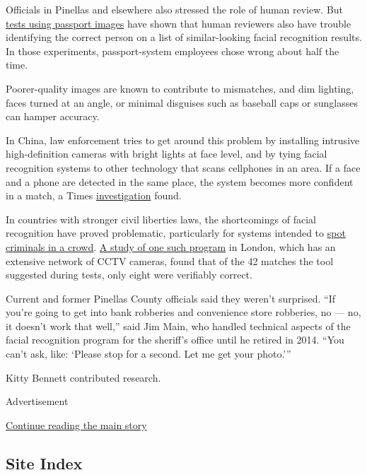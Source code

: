 Officials in Pinellas and elsewhere also stressed the role of human
review. But
\href{https://journals.plos.org/plosone/article?id=10.1371/journal.pone.0139827}{tests
using passport images} have shown that human reviewers also have trouble
identifying the correct person on a list of similar-looking facial
recognition results. In those experiments, passport-system employees
chose wrong about half the time.

Poorer-quality images are known to contribute to mismatches, and dim
lighting, faces turned at an angle, or minimal disguises such as
baseball caps or sunglasses can hamper accuracy.

In China, law enforcement tries to get around this problem by installing
intrusive high-definition cameras with bright lights at face level, and
by tying facial recognition systems to other technology that scans
cellphones in an area. If a face and a phone are detected in the same
place, the system becomes more confident in a match, a Times
\href{https://www.nytimes3xbfgragh.onion/2019/12/17/technology/china-surveillance.html}{investigation}
found.

In countries with stronger civil liberties laws, the shortcomings of
facial recognition have proved problematic, particularly for systems
intended to
\href{https://www.orlandoweekly.com/Blogs/archives/2019/07/18/orlando-cancels-amazon-rekognition-capping-15-months-of-glitches-and-controversy}{spot
criminals in a crowd}.
\href{https://48ba3m4eh2bf2sksp43rq8kk-wpengine.netdna-ssl.com/wp-content/uploads/2019/07/London-Met-Police-Trial-of-Facial-Recognition-Tech-Report.pdf}{A
study of one such program} in London, which has an extensive network of
CCTV cameras, found that of the 42 matches the tool suggested during
tests, only eight were verifiably correct.

Current and former Pinellas County officials said they weren't
surprised. ``If you're going to get into bank robberies and convenience
store robberies, no --- no, it doesn't work that well,'' said Jim Main,
who handled technical aspects of the facial recognition program for the
sheriff's office until he retired in 2014. ``You can't ask, like:
`Please stop for a second. Let me get your photo.'''

Kitty Bennett contributed research.

Advertisement

\protect\hyperlink{after-bottom}{Continue reading the main story}

\hypertarget{site-index}{%
\subsection{Site Index}\label{site-index}}

